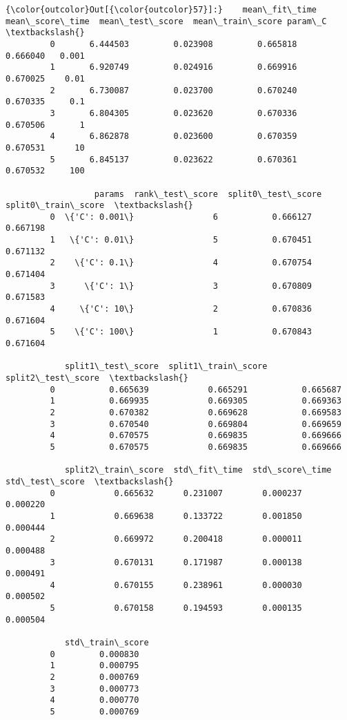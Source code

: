 \documentclass[11pt]{article}
\begin{document}
            \begin{Verbatim}[commandchars=\\\{\}]
{\color{outcolor}Out[{\color{outcolor}57}]:}    mean\_fit\_time  mean\_score\_time  mean\_test\_score  mean\_train\_score param\_C  \textbackslash{}
         0       6.444503         0.023908         0.665818          0.666040   0.001   
         1       6.920749         0.024916         0.669916          0.670025    0.01   
         2       6.730087         0.023700         0.670240          0.670335     0.1   
         3       6.804305         0.023620         0.670336          0.670506       1   
         4       6.862878         0.023600         0.670359          0.670531      10   
         5       6.845137         0.023622         0.670361          0.670532     100   
         
                  params  rank\_test\_score  split0\_test\_score  split0\_train\_score  \textbackslash{}
         0  \{'C': 0.001\}                6           0.666127            0.667198   
         1   \{'C': 0.01\}                5           0.670451            0.671132   
         2    \{'C': 0.1\}                4           0.670754            0.671404   
         3      \{'C': 1\}                3           0.670809            0.671583   
         4     \{'C': 10\}                2           0.670836            0.671604   
         5    \{'C': 100\}                1           0.670843            0.671604   
         
            split1\_test\_score  split1\_train\_score  split2\_test\_score  \textbackslash{}
         0           0.665639            0.665291           0.665687   
         1           0.669935            0.669305           0.669363   
         2           0.670382            0.669628           0.669583   
         3           0.670540            0.669804           0.669659   
         4           0.670575            0.669835           0.669666   
         5           0.670575            0.669835           0.669666   
         
            split2\_train\_score  std\_fit\_time  std\_score\_time  std\_test\_score  \textbackslash{}
         0            0.665632      0.231007        0.000237        0.000220   
         1            0.669638      0.133722        0.001850        0.000444   
         2            0.669972      0.200418        0.000011        0.000488   
         3            0.670131      0.171987        0.000138        0.000491   
         4            0.670155      0.238961        0.000030        0.000502   
         5            0.670158      0.194593        0.000135        0.000504   
         
            std\_train\_score  
         0         0.000830  
         1         0.000795  
         2         0.000769  
         3         0.000773  
         4         0.000770  
         5         0.000769  
\end{Verbatim}
        
\end{document}

